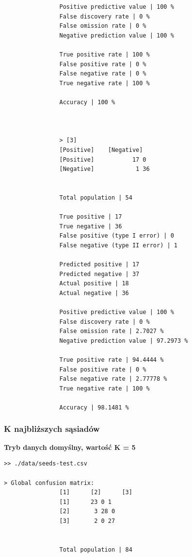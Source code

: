 \documentclass{classrep}
\begin{document}
{{{\begin{lstlisting}
                Positive predictive value | 100 %
                False discovery rate | 0 %
                False omission rate | 0 %
                Negative prediction value | 100 %

                True positive rate | 100 %
                False positive rate | 0 %
                False negative rate | 0 %
                True negative rate | 100 %

                Accuracy | 100 %



                > [3]
                [Positive]    [Negative]
                [Positive]           17 0
                [Negative]            1 36


                Total population | 54

                True positive | 17
                True negative | 36
                False positive (type I error) | 0
                False negative (type II error) | 1

                Predicted positive | 17
                Predicted negative | 37
                Actual positive | 18
                Actual negative | 36

                Positive predictive value | 100 %
                False discovery rate | 0 %
                False omission rate | 2.7027 %
                Negative prediction value | 97.2973 %

                True positive rate | 94.4444 %
                False positive rate | 0 %
                False negative rate | 2.77778 %
                True negative rate | 100 %

                Accuracy | 98.1481 %
                \end{lstlisting}
            }
            \subsubsection{K najbliższych sąsiadów}
            {
                \textbf{Tryb danych domyślny, wartość K = 5}
                \begin{lstlisting}
>> ./data/seeds-test.csv

> Global confusion matrix:
                [1]      [2]      [3]
                [1]      23 0 1
                [2]       3 28 0
                [3]       2 0 27


                Total population | 84


\end{lstlisting}}}}
\end{document}
